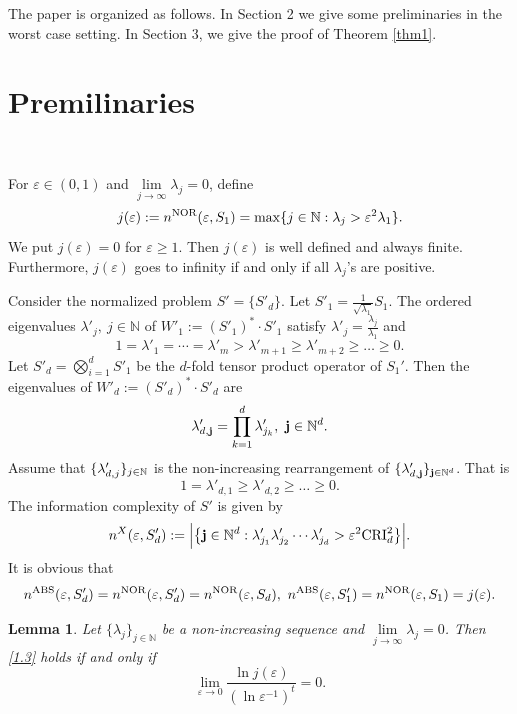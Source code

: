 \documentclass{amsart}
\newtheorem{lem}[thm]{Lemma}
\numberwithin{equation}{section}
\def\vz{\varepsilon}
\def\lz{\lambda}
\newcommand{\NN}{\mathbb{N}}
\newcommand{\bsj}{\oldsymbol{j}}
\def\NN{{\mathbb N}}
\def\bsj{{\bf j}}
\begin{document}
The paper is organized as follows. In Section 2 we give some
preliminaries in the worst case setting. In Section 3, we give the
proof of Theorem \ref{thm1}.


\section{Premilinaries}\






For $\varepsilon \in (0,1)$ and
$\lim\limits_{j\to\infty}\lambda_j=0$, define
\begin{equation}
 j(\varepsilon) :=n^{\rm NOR}(\vz,S_1)=  \max\{j \in \NN : \lambda_j > \varepsilon^2\lambda_1\}.
\end{equation}
We put $j(\vz)=0$
for $\vz\ge1$. Then $j(\vz)$ is well defined and always finite.   Furthermore, $j(\vz)$ goes
to infinity if and only if all $\lambda_j$'s are positive.


Consider the normalized problem $S'=\{S'_d\}$. Let
$S'_1=\frac{1}{\sqrt{\lambda_1}}S_1$. The ordered eigenvalues
$\lz'_j,\ {j\in \NN}$ of $W'_1:= (S'_1)^ * \cdot S'_1$ satisfy
$\lz'_j=\frac{\lz_j}{\lz_1}$ and
$$1=\lz'_1=\cdots=\lz'_m>\lz'_{m+1}\ge\lz'_{m+2}\ge\dots\ge0.$$
Let $S'_d=\bigotimes\limits_{i=1}^{d}S'_1$ be the $d$-fold tensor
product operator of $S_1'$. Then the eigenvalues of
$W'_{d}:=(S'_{d})^*\cdot S'_{d}$ are
$$\lz'_{d,\bsj}=\prod_{k=1}^d \lz'_{j_k},\ \bsj\in \Bbb N^d.$$
Assume that $\{\lambda'_{d,j}\}_{j\in\Bbb N}$ is the
non-increasing rearrangement of $\{\lz'_{d,\bsj}\}_{\bsj\in\Bbb
N^d}$. That is
$$1=\lz'_{d,1}\ge \lz'_{d,2}\ge \dots \ge 0.$$
The information complexity of $S'$ is given by
 $$n^{X}(\vz,S'_d):= \Big|\big\{\bsj \in \NN^d : \lambda'_{j_1} \lambda'_{j_2}\cdots
  \lambda'_{j_d}> \varepsilon^2 {\rm CRI}^2_d  \big\}\Big|.$$
It is obvious that
$$n^{\rm ABS}(\vz,S'_d)=n^{\rm NOR}(\vz,S'_d)=n^{\rm NOR}(\vz,S_d), \ n^{\rm ABS}(\vz,S'_1)=n^{\rm NOR}(\vz,S_1)=j(\vz).$$




\begin{lem}\label{lem1}
 Let $\{\lambda_j\}_{j\in\NN}$ be a non-increasing sequence and $\lim\limits_{j\rightarrow\infty}\lambda_j=0$. Then \eqref{1.3}   holds if and only if
 \begin{equation}\label{2.2}
 \lim_{\vz\to 0}\frac{\ln j(\vz)}{(\ln\vz^{-1})^t}=0.
\end{equation}
\end{lem}
\end{document}
